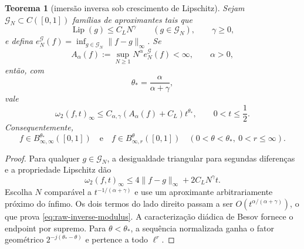 \documentclass[11pt,a4paper]{article}
\newtheorem{theorem}{Teorema}[section]
\theoremstyle{definition}
\theoremstyle{remark}
\begin{document}
\begin{theorem}[imersão inversa sob crescimento de Lipschitz]
\label{thm:raw-lossy-inverse}
Sejam $\mathcal G_N\subset C([0,1])$ famílias de aproximantes tais que
\begin{equation}
 \operatorname{Lip}(g)\le C_LN^\gamma
 \qquad(g\in\mathcal G_N),
 \qquad \gamma\ge0,
 \label{eq:lipschitz-growth-family}
\end{equation}
e defina
$e_N^{\mathcal G}(f)=\inf_{g\in\mathcal G_N}\|f-g\|_\infty$. Se
\begin{equation}
 A_\alpha(f):=\sup_{N\ge1}N^\alpha e_N^{\mathcal G}(f)<\infty,
 \qquad \alpha>0,
 \label{eq:raw-rate-assumption}
\end{equation}
então, com
\begin{equation}
 \theta_* = \frac{\alpha}{\alpha+\gamma},
 \label{eq:critical-reverse-exponent}
\end{equation}
vale
\begin{equation}
 \omega_2(f,t)_\infty
 \le C_{\alpha,\gamma}(A_\alpha(f)+C_L)t^{\theta_*},
 \qquad 0<t\le\frac12.
 \label{eq:raw-inverse-modulus}
\end{equation}
Consequentemente,
\begin{equation}
 f\in B^{\theta_*}_{\infty,\infty}([0,1])
 \quad\text{e}\quad
 f\in B^\theta_{\infty,r}([0,1])
 \quad(0<\theta<\theta_*,\ 0<r\le\infty).
 \label{eq:raw-inverse-besov}
\end{equation}
\end{theorem}

\begin{proof}
Para qualquer $g\in\mathcal G_N$, a desigualdade triangular para segundas
diferenças e a propriedade Lipschitz dão
\begin{equation}
 \omega_2(f,t)_\infty
 \le4\|f-g\|_\infty+2C_LN^\gamma t.
 \label{eq:inverse-balance}
\end{equation}
Escolha $N$ comparável a $t^{-1/(\alpha+\gamma)}$ e use um aproximante
arbitrariamente próximo do ínfimo. Os dois termos do lado direito passam a
ser $O(t^{\alpha/(\alpha+\gamma)})$, o que prova
\eqref{eq:raw-inverse-modulus}. A caracterização diádica de Besov fornece o
endpoint por supremo. Para $\theta<\theta_*$, a sequência normalizada ganha o
fator geométrico $2^{-j(\theta_*-\theta)}$ e pertence a todo $\ell^r$.
\end{proof}
\end{document}

